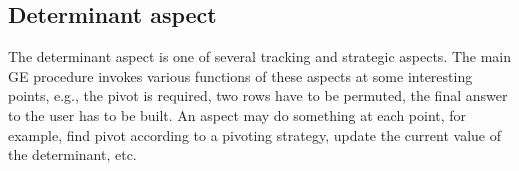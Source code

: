 \documentclass{elsart}
\begin{document}
\subsection{Determinant aspect}
\label{sec:det}

The determinant aspect is one of several tracking and strategic
aspects. The main GE procedure invokes various functions of these
aspects at some interesting points, e.g., the pivot is required, two
rows have to be permuted, the final answer to the user has to be
built. An aspect may do something at each point, for
example, find pivot according to a pivoting strategy, update the
current value of the determinant, etc.
\end{document}

